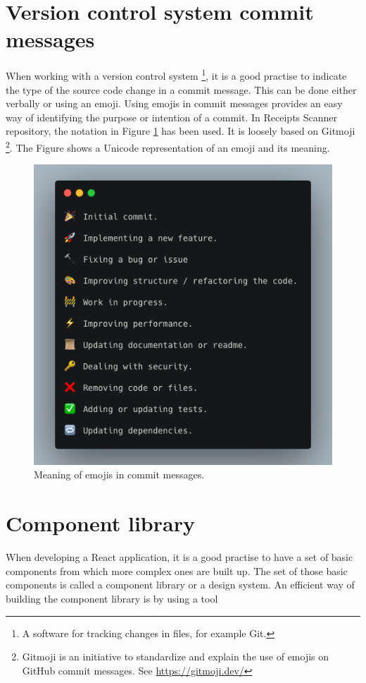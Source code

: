 \documentclass[
  digital, %
  table,   %
  oneside, %
  lof,     %
  lot,     %
]{fithesis3}
\begin{document}
\section{Version control system commit messages}
When working with a version control system \footnote{A software for tracking changes in files, for example Git.}, it is a good practise to indicate the type of the source code change in a commit message. This can be done either verbally or using an emoji.
Using emojis in commit messages provides an easy way of identifying the purpose or intention of a commit. In Receipts Scanner repository, the notation in Figure \ref{fig:emoji_commits} has been used. It is loosely based on Gitmoji \footnote{Gitmoji is an initiative to standardize and explain the use of emojis on GitHub commit messages. See \url{https://gitmoji.dev/}}. The Figure shows a Unicode representation of an emoji and its meaning.
    \begin{figure}
        \begin{center}
            \includegraphics[width=\textwidth]{figures/other/Emoji_commits}
        \end{center}
        \caption{Meaning of emojis in commit messages.}
        \label{fig:emoji_commits}
    \end{figure}

\section{Component library}
\label{sec:component_library}
When developing a React application, it is a good practise to have a set of basic components from which more complex ones are built up. The set of those basic components is called a component library or a design system. An efficient way of building the component library is by using a tool
\end{document}
